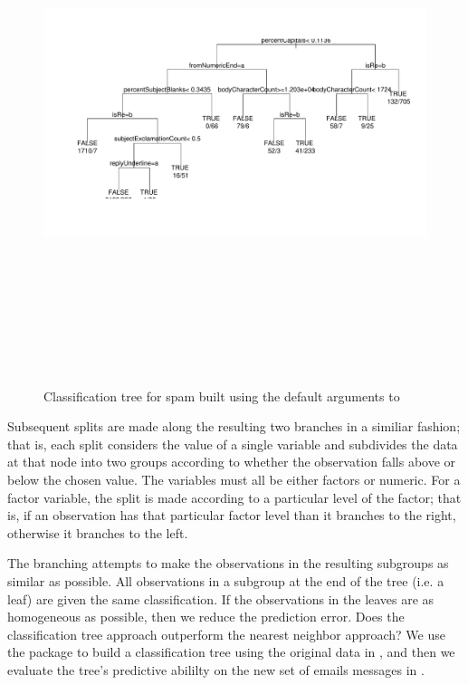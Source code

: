 \begin{figure}
\includegraphics[height=6in, angle=90]{Spam/rpartTree.pdf}
\caption{Classification tree for spam built using the
default arguments to }
\label{fig:rpartTree}
\end{figure}

Subsequent splits are made along the resulting two branches
in a similiar fashion; that is, each split considers the
value of a single variable and subdivides the 
data at that node into two groups according to whether the
observation falls above or below the chosen value. 
The variables must all be either factors or numeric.
For a factor variable, the split is made according to a 
particular level of the factor; that is, if an observation has 
that particular factor level than it branches to the right,
otherwise it branches to the left.

The branching attempts to make the observations in the resulting 
subgroups as similar as possible. 
All observations in a subgroup 
at the end of the tree (i.e. a leaf) are given the same classification.
If the observations in the leaves are as homogeneous as possible, 
then we reduce the prediction error.
Does the classification tree approach outperform 
the nearest neighbor approach?
We use the  package to build a classification
tree using the original data in , 
and then we evaluate the tree's predictive abililty on 
the new set of emails messages in .

